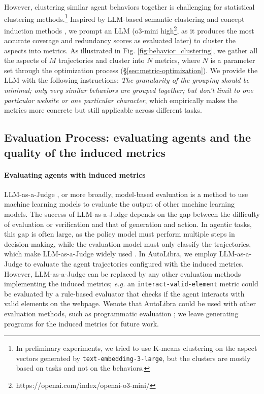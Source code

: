 However, clustering similar agent behaviors together is challenging for statistical clustering methods.\footnote{
    In preliminary experiments, we tried to use K-means clustering on the aspect vectors generated by \texttt{text-embedding-3-large},
    but the clusters are mostly based on tasks and not on the behaviors.
}
Inspired by LLM-based semantic clustering and concept induction methods \citet{viswanathan2024large,lam2024concept}, we prompt an LLM (o3-mini high\footnote{https://openai.com/index/openai-o3-mini/}, as it produces the most accurate coverage and redundancy scores as evaluated later) 
to cluster the aspects into metrics. 
As illustrated in Fig. \ref{fig:behavior_clustering},
we gather all the aspects of $M$ trajectories
and cluster into $N$ metrics, where $N$ is a parameter set through the optimization process (\S\ref{sec:metric-optimization}).
We provide the LLM with the following instructions:
\emph{The granularity of the grouping should be minimal; only very similar behaviors are grouped together; but don't limit to one particular website or one particular character}, which empirically
makes the metrics more concrete but still applicable across different tasks.


\subsection{Evaluation Process: evaluating agents and the quality of the induced metrics}
\label{sec:evaluation_process}

\paragraph{Evaluating agents with induced metrics}
LLM-as-a-Judge \citep{zheng2023judging},
or more broadly, model-based evaluation
\citep{zhang2019bertscore,celikyilmaz2021evaluationtextgenerationsurvey}
is a method to use machine learning models to evaluate the output of other machine learning models.
The success of LLM-as-a-Judge depends on the gap between the difficulty of evaluation or verification and
that of generation and action. 
In agentic tasks, this gap is often large, as the policy model must perform multiple steps in decision-making, while the evaluation model must only
classify the trajectories, which make LLM-as-a-Judge widely used \citep{zhouwebarena,he2024webvoyager,zhousotopia}.
In AutoLibra, we employ LLM-as-a-Judge to
evaluate the agent trajectories configured with the induced metrics. However, LLM-as-a-Judge
can be replaced by any other evaluation methods implementing the induced metrics;
\emph{e.g.} an \texttt{interact-valid-element} metric
could be evaluated by a rule-based evaluator that checks if the agent
interacts with valid elements on the webpage. Wenote that AutoLibra could be used with other evaluation methods, such as
programmatic evaluation \citep{maeureka}; we leave generating programs for the induced metrics for future work.

